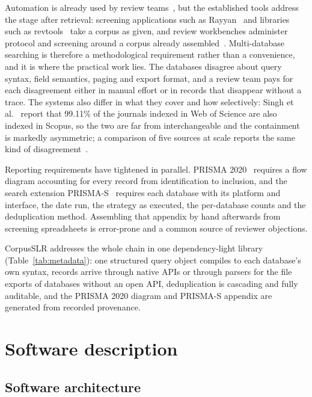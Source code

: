 \documentclass[final,5p,times,twocolumn]{elsarticle}
\begin{document}
Automation is already used by review teams~\cite{vanaltena2019}, but the
established tools address the stage after retrieval: screening applications
such as Rayyan~\cite{ouzzani2016} and libraries such as
revtools~\cite{westgate2019} take a corpus as given, and review workbenches
administer protocol and screening around a corpus already
assembled~\cite{buhos2018,reviq2026}.
Multi-database searching is therefore a methodological requirement rather than
a convenience, and it is where the practical work lies. The databases disagree
about query syntax, field semantics, paging and export format, and a review
team pays for each disagreement either in manual effort or in records that
disappear without a trace. The systems also differ in what they cover and how
selectively: Singh et al.~\cite{singh2021} report that 99.11\% of the journals
indexed in Web of Science are also indexed in Scopus, so the two are far from
interchangeable and the containment is markedly asymmetric; a comparison of
five sources at scale reports the same kind of
disagreement~\cite{visser2021}.

Reporting requirements have tightened in parallel. PRISMA
2020~\cite{prisma2020} requires a flow diagram accounting for every record
from identification to inclusion, and the search extension
PRISMA-S~\cite{prisma_s2021} requires each database with its platform and
interface, the date run, the strategy as executed, the per-database counts
and the deduplication method. Assembling that appendix by hand afterwards
from screening spreadsheets is error-prone and a common source of reviewer
objections.

CorpusSLR addresses the whole chain in one dependency-light library
(Table~\ref{tab:metadata}): one structured query object compiles to each
database's own syntax, records arrive through native APIs or through parsers
for the file exports of databases without an open API, deduplication is
cascading and fully auditable, and the PRISMA 2020 diagram and PRISMA-S
appendix are generated from recorded provenance.

\section{Software description}
\label{sec:description}

\subsection{Software architecture}
\end{document}

